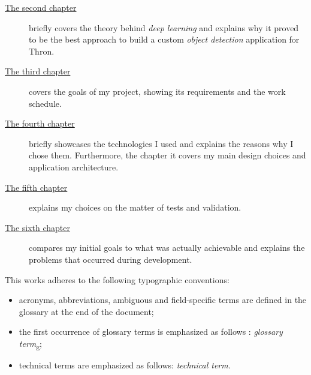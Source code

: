 \begin{description}
    \item[{\hyperref[cap:deep-learning]{The second chapter}}] briefly covers the theory behind \emph{deep learning} and explains why it proved to be the best approach to build a custom \emph{object detection} application for Thron.
    
    \item[{\hyperref[cap:internship]{The third chapter}}] covers the goals of my project, showing its requirements and the work schedule.
    
    
    \item[{\hyperref[cap:design-development]{The fourth chapter}}] briefly showcases the technologies I used and explains the reasons why I chose them. Furthermore, the chapter it covers my main design choices and application architecture.
    
    \item[{\hyperref[cap:test-validation]{The fifth chapter}}] explains my choices on the matter of tests and validation.
    
    \item[{\hyperref[cap:conclusion]{The sixth chapter}}] compares my initial goals to what was actually achievable and explains the problems that occurred during development.
\end{description}

This works adheres to the following typographic conventions:
\begin{itemize}
	\item acronyms, abbreviations, ambiguous and field-specific terms are defined in the glossary at the end of the document;
	\item the first occurrence of glossary terms is emphasized as follows : \emph{glossary term}\textsubscript{g};
	\item technical terms are emphasized as follows: \emph{technical term}.
\end{itemize}